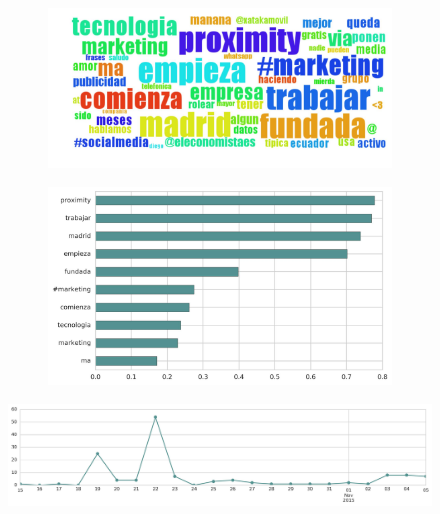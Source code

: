 \begin{figure}[htbp!]
    \centering
    \begin{subfigure}[b]{0.49\textwidth}
        \includegraphics[width=\textwidth]{twitter_all/report_images/topic-09-wordcloud.jpg}
    \end{subfigure}
    \begin{subfigure}[b]{0.49\textwidth}
        \includegraphics[width=\textwidth]{twitter_all/report_images/topic-09-terms.jpg}
    \end{subfigure}
\end{figure}

\begin{figure}[htbp!]
    \centering
    \includegraphics[width=\textwidth]{twitter_all/report_images/topic-09-timeseries.jpg}
\end{figure}

